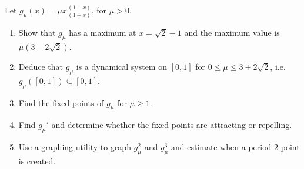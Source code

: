 \begin{problem}{2}
  Let $\displaystyle g_\mu(x) = \mu x \frac{(1-x)}{(1+x)}$, for $\mu > 0$.

  \begin{enumerate}
    \item Show that $g_\mu$ has a maximum at $x = \sqrt{2} - 1$ and the maximum value is
      $\mu(3 - 2\sqrt{2})$.
    \item Deduce that $g_\mu$ is a dynamical system on $[0, 1]$
      for $0 \leq \mu \leq 3 + 2\sqrt{2}$, i.e. $g_\mu([0,1])\subseteq[0,1]$.
    \item Find the fixed points of $g_\mu$ for $\mu \geq 1$.
    \item Find $g_\mu'$ and determine whether the fixed points are attracting
      or repelling.
    \item Use a graphing utility to graph $g_\mu^2$ and $g_\mu^3$
      and estimate when a period 2 point is created.
  \end{enumerate}
\end{problem}

